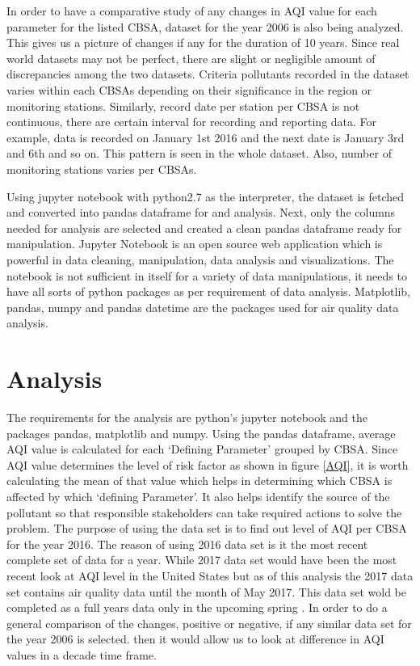 \documentclass[sigconf]{acmart}
\begin{document}
   In order to have a comparative study of any changes in AQI value for each parameter for the listed CBSA, dataset for the year 2006 is also being analyzed. This gives us a picture of changes if any for the duration of 10 years. Since real world datasets may not be perfect, there are slight or negligible amount of discrepancies among the two datasets.
   Criteria pollutants recorded in the dataset varies within each CBSAs depending on their significance in the region or monitoring stations. Similarly, record date per station per CBSA is not continuous, there are certain interval for recording and reporting data. For example, data is recorded on January 1st 2016 and the next date is January 3rd and 6th and so on. This pattern is seen in the whole dataset. Also, number of monitoring stations varies per CBSAs.

   Using jupyter notebook with python2.7 as the interpreter, the dataset is fetched and converted into pandas dataframe for  and analysis. Next, only the columns needed for analysis are   selected and created a clean pandas dataframe ready for manipulation. Jupyter Notebook is an open source web application which is powerful in data cleaning, manipulation, data analysis and visualizations. The notebook is not sufficient in itself for a variety of data manipulations, it needs to have all sorts of python packages as per requirement of data analysis. Matplotlib, pandas, numpy and pandas datetime are the packages used for air quality data analysis.  


\section{Analysis}
   The requirements for the analysis are python's jupyter notebook and the packages pandas, matplotlib and numpy. Using the pandas dataframe, average AQI value is calculated for each `Defining Parameter' grouped by CBSA.  Since AQI value determines the level of risk factor as shown in figure \ref{AQI}, it is worth calculating the mean of that value which helps in determining which CBSA is affected by which `defining Parameter'. It also helps identify the source of the pollutant so that responsible stakeholders can take required actions to solve the problem. The purpose of using the data set is to find out level of AQI per CBSA  for the year 2016. The reason of using 2016 data set is it the most recent complete set of data for a year. While 2017 data set would have been the most recent look at AQI level in the United States but as of this analysis the 2017 data set contains air quality data until the month of May 2017. This data set wold be completed as a full years data only in the upcoming spring \cite{outdoor-air}. In order to do a general comparison of the changes, positive or negative, if any similar data set for the year 2006 is selected. then it would allow us to look at difference in AQI values in a decade time frame. 
\end{document}
